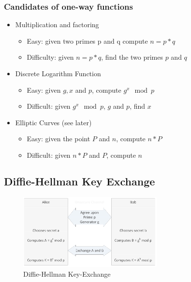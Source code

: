 \hypertarget{candidates-of-one-way-functions}{%
\subsubsection{Candidates of one-way
functions}\label{candidates-of-one-way-functions}}

\begin{itemize}
\tightlist
\item
  Multiplication and factoring

  \begin{itemize}
  \tightlist
  \item
    Easy: given two primes p and q compute $n = p*q$
  \item
    Difficulty: given $n = p*q$, find the two primes $p$ and $q$
  \end{itemize}
\item
  Discrete Logarithm Function

  \begin{itemize}
  \tightlist
  \item
    Easy: given $g, x$ and $p$, compute $g^x \mod p$
  \item
    Difficult: given $g^x \mod p$, $g$ and $p$, find $x$
  \end{itemize}
\item
  Elliptic Curves (see later)

  \begin{itemize}
  \tightlist
  \item
    Easy: given the point $P$ and $n$, compute $n*P$
  \item
    Difficult: given $n*P$ and $P$, compute $n$
  \end{itemize}
\end{itemize}

\hypertarget{diffie-hellman-key-exchange}{%
\subsection{Diffie-Hellman Key
Exchange}\label{diffie-hellman-key-exchange}}

\begin{figure}[H]
\centering
\includegraphics[width=0.65\textwidth]{figures/dhke.png}
\caption{Diffie-Hellman Key-Exchange}
\end{figure}

